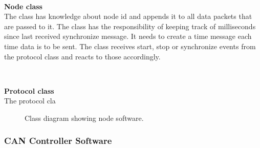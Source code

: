 ~\\ \par \textbf{Node class} ~ \\
The class has knowledge about node id and appends it to all data packets that are passed to it.
The class has the responsibility of keeping track of milliseconds since last received synchronize message.
It needs to create a time message each time data is to be sent.
The class receives start, stop or synchronize events from the protocol class and reacts to those accordingly.

~\\ \par \textbf{Protocol class} ~ \\
The protocol cla

\begin{figure}[!h]
\centering
{}
\caption{Class diagram showing node software.}
\label{fig:node_class_diagram}
\end{figure}


\subsubsection*{CAN Controller Software}
